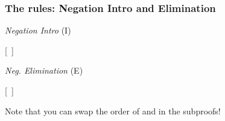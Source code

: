 \begin{frame}
  \frametitle{The rules: Negation Intro and Elimination}
  
\begin{multicols}{2}

\begin{center}
\textit{Negation Intro} (\enot I) \vspace{0.25em}
    \begin{fitchproof}
    \open
	\metaA{} 
	 \ellipsesline
	\metaB{}
	 \ellipsesline
\close
{}[\ ]{\enot\metaA{}}
    \end{fitchproof}
    \end{center}
   
   \columnbreak
    
\begin{center}
\textit{Neg. Elimination} (\enot E) %
    \begin{fitchproof}
\open
	 \ellipsesline
	\metaB{}
	 \ellipsesline
\close
{}[\ ]\metaA{}
    \end{fitchproof}
    \end{center}
\end{multicols}

Note that you can swap the order of \metaB{} and \enot\metaB{} in the subproofs! 
\end{frame}


